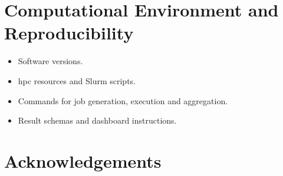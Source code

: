 \documentclass[]{UCD_CS_MSc_AAI_Report}
\begin{document}
\chapter{Computational Environment and Reproducibility}
\label{app:reproducibility}
\begin{itemize}
    \item Software versions.
    \item \ac{hpc} resources and Slurm scripts.
    \item Commands for job generation, execution and aggregation.
    \item Result schemas and dashboard instructions.
\end{itemize}

\chapter*{Acknowledgements}

\printbibliography
\end{document}
